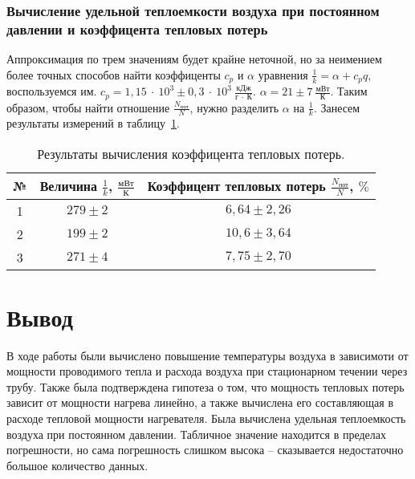 \documentclass[a4paper,11pt]{article}
\begin{document}
\subsubsection{Вычисление удельной теплоемкости воздуха при постоянном давлении и коэффицента тепловых потерь}
Аппроксимация по трем значениям будет крайне неточной, но за неимением более точных способов найти коэффиценты $c_{p}$ и $\alpha$ уравнения $\frac{1}{k} = \alpha + c_{p}q$, воспользуемся им.\newline
$c_{p} = 1,15\ \cdot\ 10^{3} \pm 0,3\ \cdot\ 10^{3}\ \frac{кДж}{г\ \cdot\ К}$.\newline\newline
$\alpha = 21 \pm 7\ \frac{мВт}{К}$.\newline\newline
Таким образом, чтобы найти отношение $\frac{N_{пот}}{N}$, нужно разделить $\alpha$ на $\frac{1}{k}$. Занесем результаты измерений в таблицу~\ref{table:tab8}.
\begin{table}[h!]
\centering
\begin{tabular}{ ||c|c|c|| }
  \hline
  № & Величина $\frac{1}{k}$, $\frac{мВт}{К}$ & Коэффицент тепловых потерь $\frac{N_{пот}}{N}$, $\%$ \\
  \hline
  1 & $279 \pm 2$ & $6,64 \pm 2,26$ \\
  2 & $199 \pm 2$ & $10,6 \pm 3,64$ \\
  3 & $271 \pm 4$ & $7,75 \pm 2,70$ \\
  \hline
\end{tabular}
\caption{Результаты вычисления коэффицента тепловых потерь.}
\label{table:tab8}
\end{table}
\section{Вывод}
В ходе работы были вычислено повышение температуры воздуха в зависимоти от мощности проводимого тепла и расхода воздуха при стационарном течении через трубу. Также была подтверждена гипотеза о том, что мощность тепловых потерь зависит от мощности нагрева линейно, а также вычислена его составляющая в расходе тепловой мощности нагревателя. Была вычислена удельная теплоемкость воздуха при постоянном давлении. Табличное значение находится в пределах погрешности, но сама погрешность слишком высока -- сказывается недостаточно большое количество данных.
\end{document}
